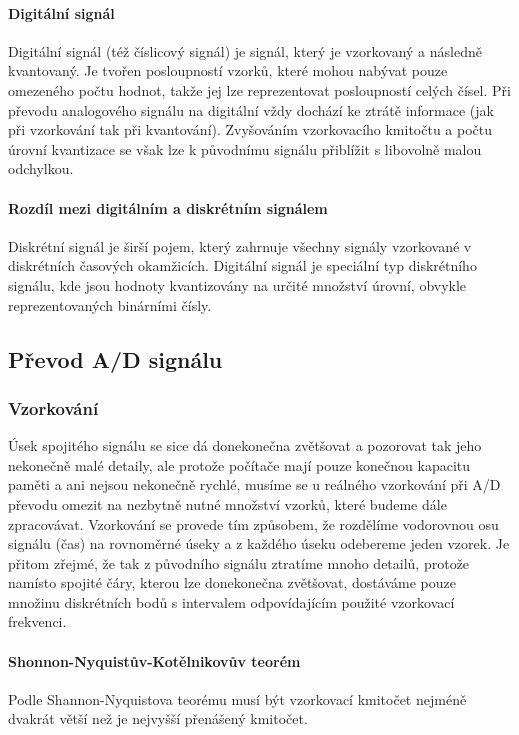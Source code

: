 \paragraph{Digitální signál}
Digitální signál (též číslicový signál) je signál, který je vzorkovaný a následně kvantovaný. Je tvořen posloupností vzorků, které mohou nabývat pouze omezeného počtu hodnot, takže jej lze reprezentovat posloupností celých čísel. Při převodu analogového signálu na digitální vždy dochází ke ztrátě informace (jak při vzorkování tak při kvantování). Zvyšováním vzorkovacího kmitočtu a počtu úrovní kvantizace se však lze k původnímu signálu přiblížit s libovolně malou odchylkou.
\begin{figure}[htbp]
\centering

\end{figure}
\paragraph{Rozdíl mezi digitálním a diskrétním signálem} 
Diskrétní signál je širší pojem, který zahrnuje všechny signály vzorkované v diskrétních časových okamžicích. Digitální signál je speciální typ diskrétního signálu, kde jsou hodnoty kvantizovány na určité množství úrovní, obvykle reprezentovaných binárními čísly.

\subsection{Převod A/D signálu}

\subsubsection{Vzorkování}
Úsek spojitého signálu se sice dá donekonečna zvětšovat a pozorovat tak jeho nekonečně malé detaily, ale protože počítače mají pouze konečnou kapacitu paměti a ani nejsou nekonečně rychlé, musíme se u reálného vzorkování při A/D převodu omezit na nezbytně nutné množství vzorků, které budeme dále zpracovávat.
Vzorkování se provede tím způsobem, že rozdělíme vodorovnou osu signálu (čas) na rovnoměrné úseky a z každého úseku odebereme jeden vzorek. Je přitom zřejmé, že tak z původního signálu ztratíme mnoho detailů, protože namísto spojité čáry, kterou lze donekonečna zvětšovat, dostáváme pouze množinu diskrétních bodů s intervalem odpovídajícím použité vzorkovací frekvenci.

\paragraph{Shonnon-Nyquistův-Kotělnikovův teorém}
Podle Shannon-Nyquistova teorému musí být vzorkovací kmitočet nejméně dvakrát větší než je nejvyšší přenášený kmitočet.

